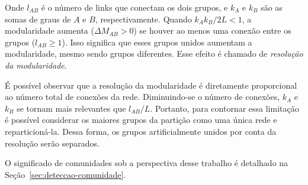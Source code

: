 \documentclass[12pt,a4paper,final]{article}
\begin{document}
Onde $l_{AB}$ é o número de links que conectam os dois grupos, e $k_A$ e $k_B$ são as somas de graus de $A$ e $B$, respectivamente. Quando $k_A k_B / 2L < 1$, a modularidade aumenta ($\Delta M_{AB} > 0$) se houver ao menos uma conexão entre os grupos ($l_{AB} \geq 1$). Isso significa que esses grupos unidos aumentam a modularidade, mesmo sendo grupos diferentes. Esse efeito é chamado de \textit{resolução da modularidade}.

É possível observar que a resolução da modularidade é diretamente proporcional ao número total de conexões da rede. Diminuindo-se o número de conexões, $k_A$ e $k_B$ se tornam mais relevantes que $l_{AB} / L$. Portanto, para contornar essa limitação é possível considerar os maiores grupos da partição como uma única rede e reparticioná-la. Dessa forma, os grupos artificialmente unidos por conta da resolução serão separados.


O significado de comunidades sob a perspectiva desse trabalho é detalhado na Seção~\ref{sec:deteccao-comunidade}.
\end{document}
